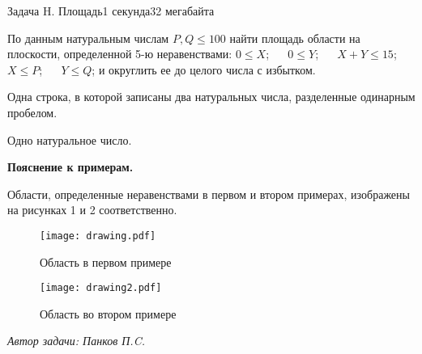 \documentclass[11pt,a4paper,oneside]{article}
\begin{document}
\begin{problem}{Задача H. Площадь}{1 секунда}{32 мегабайта}

По данным натуральным числам  $P, Q \leq 100$ найти площадь области на плоскости, определенной 5-ю неравенствами:  $0 \leq X$; ~~ $0\leq Y$; ~~ $X+Y\leq 15$;~~ $X\leq P$;
~~ $Y \leq Q$;
и округлить ее до целого числа с избытком. 


\InputFile

Одна строка, в которой записаны два натуральных числа, разделенные одинарным пробелом.

\OutputFile
Одно натуральное число.


\Examples

\begin{example}%
%
%
\end{example}

\vspace{0.1cm}
\medskip\noindent
\textbf{Пояснение к примерам.}


Области, определенные неравенствами в первом и втором примерах, изображены на рисунках 1 и 2 соответственно.

\begin{figure}[ht]
\centering
\texttt{[image: drawing.pdf]}
\caption{Область в первом
 примере}
\end{figure}

\vspace{-0.2cm}
\begin{figure}[ht]
\centering
\texttt{[image: drawing2.pdf]}
\caption{Область во втором примере}
\end{figure}






\vspace{1.0cm}
\hfill \textit{Автор задачи: Панков П.C.}
\medskip\noindent




\end{problem}
\end{document}
